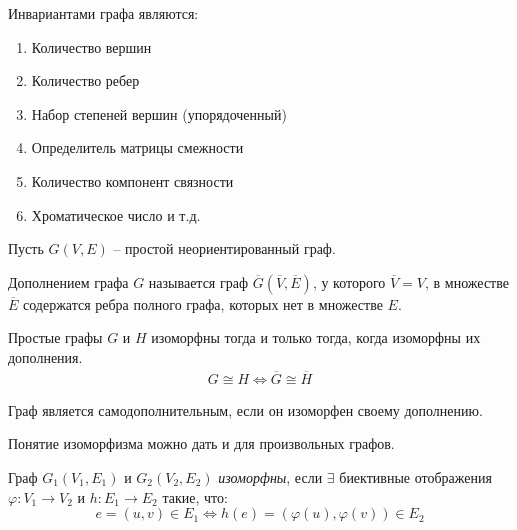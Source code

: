 Инвариантами графа являются:
\begin{enumerate}[left=0.0em, labelsep=1em, topsep=0.0em, itemsep=0pt, parsep=0.5em]
    \item Количество вершин
    \item Количество ребер
    \item Набор степеней вершин (упорядоченный)
    \item Определитель матрицы смежности
    \item Количество компонент связности
    \item Хроматическое число и т.д.
\end{enumerate}

Пусть $G(V,E)$ -- простой неориентированный граф.

\begin{definition}
    Дополнением графа $G$ называется граф $\overline{G}(\overline{V},\overline{E})$,
    у которого $\overline{V}=V$, в множестве $\overline{E}$ содержатся ребра полного графа,
    которых нет в множестве $E$.
\end{definition}

\begin{theorem}
    Простые графы $G$ и $H$ изоморфны тогда и только тогда, когда изоморфны их дополнения.
    \begin{align*}
        G \cong H \Leftrightarrow \overline{G} \cong \overline{H}
    \end{align*}
\end{theorem}

\begin{definition}
    Граф является самодополнительным, если он изоморфен своему дополнению.
\end{definition}

Понятие изоморфизма можно дать и для произвольных графов.

\begin{definition}
    Граф $G_1(V_1,E_1)$ и $G_2(V_2,E_2)$ \textit{изоморфны}, если $\exists$
    биективные отображения $\varphi : V_1 \rightarrow V_2$ и $h: E_1 \rightarrow E_2$
    такие, что:
    $$e = (u,v) \in E_1 \Leftrightarrow h(e) = (\varphi(u),\varphi(v)) \in E_2$$
\end{definition}